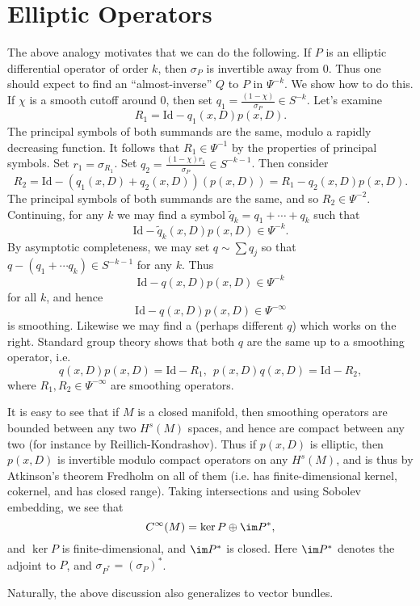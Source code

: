 \documentclass[12pt]{article}
\begin{document}
\section{Elliptic Operators}
The above analogy motivates that we can do the following. If $P$ is an elliptic differential operator of order $k$, then $\sigma_P$ is invertible away from $0$. Thus one should expect to find an ``almost-inverse'' $Q$ to $P$ in $\Psi^{-k}$. We show how to do this. If $\chi$ is a smooth cutoff around $0$, then set $q_1 = \frac{(1-\chi)}{\sigma_P} \in S^{-k}$. Let's examine
\[R_1 = \text{Id} - q_1(x,D)p(x,D).\] The principal symbols of both summands are the same, modulo a rapidly decreasing function. It follows that $R_1 \in \Psi^{-1}$ by the properties of principal symbols. Set $r_1 = \sigma_{R_1}$. Set $q_2 =  \frac{(1-\chi)r_1}{\sigma_P} \in S^{-k-1}$. Then consider
\[R_2 = \text{Id} - (q_1(x,D)+q_2(x,D))(p(x,D)) = R_1 -q_2(x,D)p(x,D).\] The principal symbols of both summands are the same, and so $R_2 \in \Psi^{-2}$. Continuing, for any $k$ we may find a symbol $\tilde{q}_k = q_1+\cdots+q_k$ such that
\[\text{Id}-\tilde{q}_k(x,D)p(x,D) \in \Psi^{-k}.\] By asymptotic completeness, we may set $q \sim \sum q_j$ so that $q-(q_1+\cdots q_k) \in S^{-k-1}$ for any $k$. Thus
\[\text{Id}-q(x,D)p(x,D) \in \Psi^{-k}\] for all $k$, and hence 
\[\text{Id}-q(x,D)p(x,D) \in \Psi^{-\infty}\]
is smoothing. Likewise we may find a (perhaps different $q$) which works on the right. Standard group theory shows that both $q$ are the same up to a smoothing operator, i.e.
\[q(x,D)p(x,D) = \text{Id}-R_1, \ \ p(x,D)q(x,D) = \text{Id}-R_2,\]
where $R_1,R_2 \in \Psi^{-\infty}$ are smoothing operators.

It is easy to see that if $M$ is a closed manifold, then smoothing operators are bounded between any two $H^s(M)$ spaces, and hence are compact between any two (for instance by Reillich-Kondrashov). Thus if $p(x,D)$ is elliptic, then $p(x,D)$ is invertible modulo compact operators on any $H^s(M)$, and is thus by Atkinson's theorem Fredholm on all of them (i.e. has finite-dimensional kernel, cokernel, and has closed range). Taking intersections and using Sobolev embedding, we see that
\[C^\infty(M) = \ker P\oplus \im P^\ast,\] and $\ker P$ is finite-dimensional, and $\im P^\ast$ is closed. Here $\im P^\ast$ denotes the adjoint to $P$, and $\sigma_{P^\ast} = (\sigma_P)^\ast$.

Naturally, the above discussion also generalizes to vector bundles.
\end{document}
